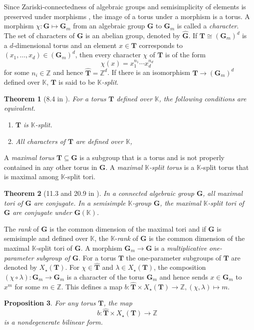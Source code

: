 \documentclass[12pt]{amsart}
\newcommand{\Z}{\mathbb{Z} }
\newcommand{\K}{\mathbb{K}}
\newcommand{\bG}{\mathbf{G}}
\newcommand{\bT}{\mathbf{T}}
\numberwithin{equation}{section}
\newtheorem{theorem}{Theorem}[section]
\newtheorem{proposition}[theorem]{Proposition}
\theoremstyle{remark} %
\begin{document}
Since Zariski-connectedness of algebraic groups and semisimplicity of elements is preserved under morphisms \cite[4.4(4)]{Bor}, the image of a torus under a morphism is a torus. %
 A morphism $\chi \colon \bG \mapsto \bG_m$ from an algebraic group $\bG$ to $\bG_m$ is called a \emph{character}. The set of characters of $\bG$ is an abelian group, denoted by $\hat{\bG}$. If $\bT \cong (\bG_m)^d$ is a $d$-dimensional torus and an element $x \in \bT$ corresponds to $(x_1, \ldots , x_d)  \in (\bG_m)^d$, then every character $\chi$ of $\bT$ is of the form 
 $$
 \chi(x) = x_1^{n_1} \cdots x_d^{n_d}
 $$
 for some $n_i \in \Z$ and hence $\hat{\bT} = \Z^d$. If there is an isomorphism $\bT \to (\bG_m)^d$ defined over $\K$, $\bT$ is said to be \emph{$\K$-split}.
  
   \begin{theorem}[8.4 in \cite{Bor}]
  	For a torus $\bT$ defined over $\K$, the following conditions are equivalent.
  	\begin{enumerate}
 	\item $\bT$ is $\K$-split.
 	\item All characters of $\bT$ are defined over $\K$, 
  	\end{enumerate}
  \end{theorem}

A \emph{maximal torus} $\bT \subseteq \bG$ is a subgroup that is a torus and is not properly contained in any other torus in $\bG$. A \emph{maximal $\K$-split torus} is a $\K$-split torus that is maximal among $\K$-split tori.

\begin{theorem}[11.3 and 20.9 in \cite{Bor}]
	In a connected algebraic group $\bG$, all maximal tori of $\bG$ are conjugate. In a semisimple 
	$\K$-group $\bG$, the maximal $\K$-split tori of $\bG$ are conjugate under $\bG(\K)$.
\end{theorem}
The \emph{rank} of $\bG$ is the common dimension of the maximal tori and if $\bG$ is semisimple 
and defined over $\K$, the $\K$-\emph{rank} of $\bG$ is the common dimension of the maximal $\K$-split tori of $\bG$. A morphism $\bG_m \to \bG$ is a \emph{multiplicative one-parameter subgroup of $\bG$}. For a torus $\bT$ the one-parameter subgroups of $\bT$ are denoted by $X_{\star}(\bT)$. For $\chi \in \hat{\bT}$ and $\lambda \in X_{\star}(\bT) $, the composition $(\chi\circ\lambda) \colon \bG_m \to \bG_m$ is a character of the torus $\bG_m$ and hence sends $x \in \bG_m$ to $x^m$ for some $m \in \Z$. This defines a map $b \colon \hat{\bT} \times X_{\star}(\bT) \to \Z, (\chi,\lambda) \mapsto m$. 
\begin{proposition}{\cite[Proposition 8.7]{Bor}}\label{prop:char_cochar}
	For any torus $\bT$, the map 
	$$
	b\colon \hat{\bT} \times X_{\star}(\bT) \to \Z
	$$
	is a nondegenerate bilinear form.
\end{proposition}  
\end{document}
